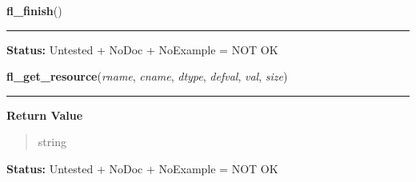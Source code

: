     \label{xformslib:library:fl_finish}

    \vspace{0.5ex}

\hspace{.8\funcindent}\begin{boxedminipage}{\funcwidth}

    \raggedright \textbf{fl\_finish}()

    \vspace{-1.5ex}

    \rule{\textwidth}{0.5\fboxrule}
\setlength{\parskip}{2ex}
\setlength{\parskip}{1ex}
\textbf{Status:} Untested + NoDoc + NoExample = NOT OK



    \end{boxedminipage}

    \label{xformslib:library:fl_get_resource}

    \vspace{0.5ex}

\hspace{.8\funcindent}\begin{boxedminipage}{\funcwidth}

    \raggedright \textbf{fl\_get\_resource}(\textit{rname}, \textit{cname}, \textit{dtype}, \textit{defval}, \textit{val}, \textit{size})

    \vspace{-1.5ex}

    \rule{\textwidth}{0.5\fboxrule}
\setlength{\parskip}{2ex}
\setlength{\parskip}{1ex}
      \textbf{Return Value}
    \vspace{-1ex}

      \begin{quote}
      string

      \end{quote}

\textbf{Status:} Untested + NoDoc + NoExample = NOT OK



    \end{boxedminipage}

    \label{xformslib:library:fl_set_resource}

